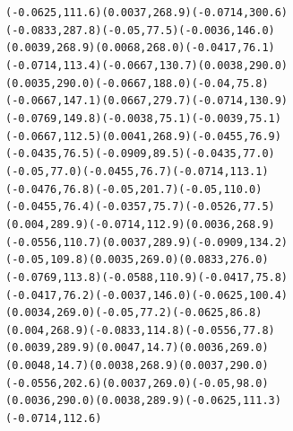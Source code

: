 \documentclass[letterpaper,10pt,russian]{/usr/lib/python3.3/site-packages/sphinx/texinputs/sphinxhowto}
\newenvironment{InvisibleVerbatim}
        {\begin{mdframed}[leftmargin=0.1\linewidth,innerleftmargin=3pt,innerrightmargin=3pt, userdefinedwidth=1\linewidth, linewidth=0pt, linecolor=white, usetwoside=false]}
        {\end{mdframed}}
\begin{document}
    

        
        

            
                \begin{InvisibleVerbatim}
                \vspace{-0\baselineskip}
\begin{alltt}(-0.0625, 111.6)       (0.0037, 268.9)       (-0.0714, 300.6)
(-0.0833, 287.8)       (-0.05, 77.5)       (-0.0036, 146.0)
(0.0039, 268.9)       (0.0068, 268.0)       (-0.0417, 76.1)
(-0.0714, 113.4)       (-0.0667, 130.7)       (0.0038, 290.0)
(0.0035, 290.0)       (-0.0667, 188.0)       (-0.04, 75.8)
(-0.0667, 147.1)       (0.0667, 279.7)       (-0.0714, 130.9)
(-0.0769, 149.8)       (-0.0038, 75.1)       (-0.0039, 75.1)
(-0.0667, 112.5)       (0.0041, 268.9)       (-0.0455, 76.9)
(-0.0435, 76.5)       (-0.0909, 89.5)       (-0.0435, 77.0)
(-0.05, 77.0)       (-0.0455, 76.7)       (-0.0714, 113.1)
(-0.0476, 76.8)       (-0.05, 201.7)       (-0.05, 110.0)
(-0.0455, 76.4)       (-0.0357, 75.7)       (-0.0526, 77.5)
(0.004, 289.9)       (-0.0714, 112.9)       (0.0036, 268.9)
(-0.0556, 110.7)       (0.0037, 289.9)       (-0.0909, 134.2)
(-0.05, 109.8)       (0.0035, 269.0)       (0.0833, 276.0)
(-0.0769, 113.8)       (-0.0588, 110.9)       (-0.0417, 75.8)
(-0.0417, 76.2)       (-0.0037, 146.0)       (-0.0625, 100.4)
(0.0034, 269.0)       (-0.05, 77.2)       (-0.0625, 86.8)
(0.004, 268.9)       (-0.0833, 114.8)       (-0.0556, 77.8)
(0.0039, 289.9)       (0.0047, 14.7)       (0.0036, 269.0)
(0.0048, 14.7)       (0.0038, 268.9)       (0.0037, 290.0)
(-0.0556, 202.6)       (0.0037, 269.0)       (-0.05, 98.0)
(0.0036, 290.0)       (0.0038, 289.9)       (-0.0625, 111.3)
(-0.0714, 112.6)\end{alltt}

            \end{InvisibleVerbatim}
            
        
    


\end{document}
